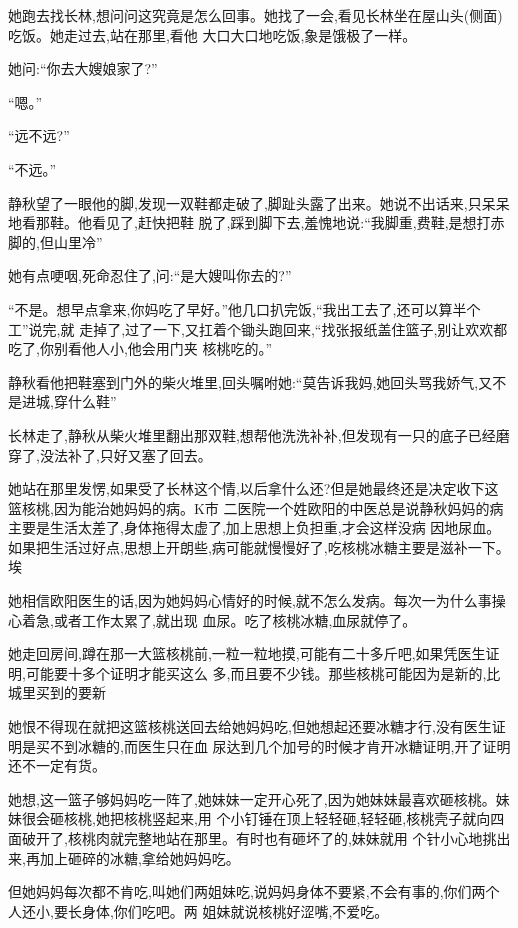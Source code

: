 ﻿\documentclass[12pt]{article}
\begin{document}
她跑去找长林,想问问这究竟是怎么回事。她找了一会,看见长林坐在屋山头(侧面)吃饭。她走过去,站在那里,看他
大口大口地吃饭,象是饿极了一样。

她问:``你去大嫂娘家了?''

``嗯。''

``远不远?''

``不远。''

静秋望了一眼他的脚,发现一双鞋都走破了,脚趾头露了出来。她说不出话来,只呆呆地看那鞋。他看见了,赶快把鞋
脱了,踩到脚下去,羞愧地说:``我脚重,费鞋,是想打赤脚的,但山里冷\myrule ''

她有点哽咽,死命忍住了,问:``是大嫂叫你去的?''

``不是。想早点拿来,你妈吃了早好\myrule 。''他几口扒完饭,``我出工去了,还可以算半个工\myrule ''说完,就
走掉了,过了一下,又扛着个锄头跑回来,``找张报纸盖住篮子,别让欢欢都吃了\myrule ,你别看他人小,他会用门夹
核桃吃的。''

静秋看他把鞋塞到门外的柴火堆里,回头嘱咐她:``莫告诉我妈,她回头骂我娇气,又不是进城,穿什么鞋\myrule ''

长林走了,静秋从柴火堆里翻出那双鞋,想帮他洗洗补补,但发现有一只的底子已经磨穿了,没法补了,只好又塞了回去。

她站在那里发愣,如果受了长林这个情,以后拿什么还?但是她最终还是决定收下这篮核桃,因为能治她妈妈的病。K市
二医院一个姓欧阳的中医总是说静秋妈妈的病主要是生活太差了,身体拖得太虚了,加上思想上负担重,才会这样没病
因地尿血。如果把生活过好点,思想上开朗些,病可能就慢慢好了,吃核桃冰糖主要是滋补一下。埃

她相信欧阳医生的话,因为她妈妈心情好的时候,就不怎么发病。每次一为什么事操心着急,或者工作太累了,就出现
血尿。吃了核桃冰糖,血尿就停了。

她走回房间,蹲在那一大篮核桃前,一粒一粒地摸,可能有二十多斤吧,如果凭医生证明,可能要十多个证明才能买这么
多,而且要不少钱。那些核桃可能因为是新的,比城里买到的要新

她恨不得现在就把这篮核桃送回去给她妈妈吃,但她想起还要冰糖才行,没有医生证明是买不到冰糖的,而医生只在血
尿达到几个加号的时候才肯开冰糖证明,开了证明还不一定有货。

她想,这一篮子够妈妈吃一阵了,她妹妹一定开心死了,因为她妹妹最喜欢砸核桃。妹妹很会砸核桃,她把核桃竖起来,用
个小钉锤在顶上轻轻砸,轻轻砸,核桃壳子就向四面破开了,核桃肉就完整地站在那里。有时也有砸坏了的,妹妹就用
个针小心地挑出来,再加上砸碎的冰糖,拿给她妈妈吃。

但她妈妈每次都不肯吃,叫她们两姐妹吃,说妈妈身体不要紧,不会有事的,你们两个人还小,要长身体,你们吃吧。两
姐妹就说核桃好涩嘴,不爱吃。
\end{document}
